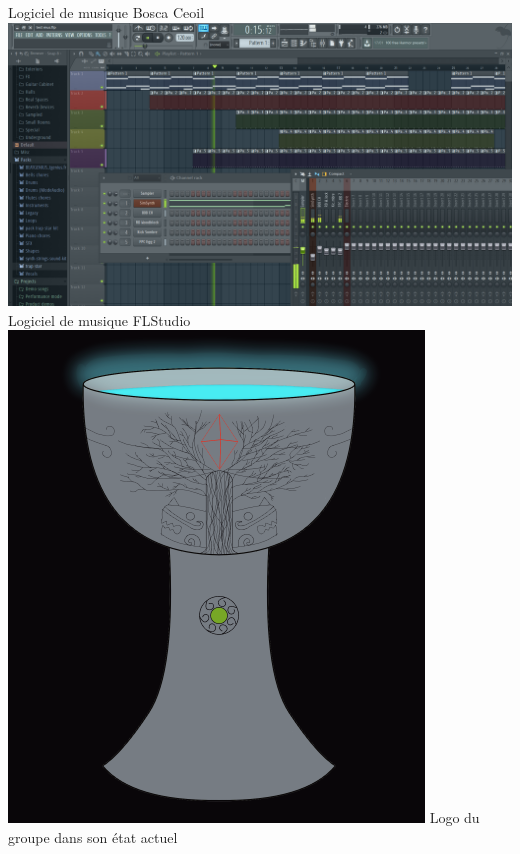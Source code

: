 \documentclass[]{extarticle}
\begin{document}
\begin{center}
\smallbreak
Logiciel de musique Bosca Ceoil
\bigbreak
\bigbreak
\includegraphics[scale = 0.18]{fruitloop.png}
\smallbreak
Logiciel de musique FLStudio
\bigbreak
\bigbreak
\includegraphics[scale = 0.3]{coupe.png}
\smallbreak
Logo du groupe dans son état actuel
\bigbreak
\bigbreak

\end{center}
\end{document}
